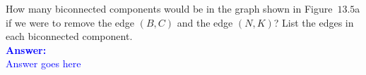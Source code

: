 \item{}
How many biconnected components would be in the graph shown in Figure~$13.5$a
if we were to remove the edge $(B,C)$ and the edge $(N,K)$? List the edges in
each biconnected component.\\[12pt]
\ifanswers
\textcolor{blue}{
\textbf{Answer:}\\[6pt]
Answer goes here
}
\newpage
\fi
